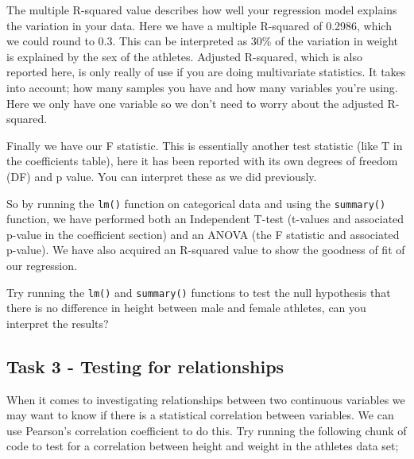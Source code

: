 \documentclass[
]{book}
\newenvironment{Shaded}{\begin{snugshade}}{\end{snugshade}}
\newcommand{\AttributeTok}[1]{\textcolor[rgb]{0.13,0.29,0.53}{#1}}
\newcommand{\CommentTok}[1]{\textcolor[rgb]{0.56,0.35,0.01}{\textit{#1}}}
\newcommand{\FunctionTok}[1]{\textcolor[rgb]{0.13,0.29,0.53}{\textbf{#1}}}
\newcommand{\NormalTok}[1]{#1}
\newcommand{\OtherTok}[1]{\textcolor[rgb]{0.56,0.35,0.01}{#1}}
\newcommand{\SpecialCharTok}[1]{\textcolor[rgb]{0.81,0.36,0.00}{\textbf{#1}}}
\newcommand{\StringTok}[1]{\textcolor[rgb]{0.31,0.60,0.02}{#1}}
\begin{document}
The multiple R-squared value describes how well your regression model explains the variation in your data. Here we have a multiple R-squared of 0.2986, which we could round to 0.3. This can be interpreted as 30\% of the variation in weight is explained by the sex of the athletes. Adjusted R-squared, which is also reported here, is only really of use if you are doing multivariate statistics. It takes into account; how many samples you have and how many variables you're using. Here we only have one variable so we don't need to worry about the adjusted R-squared.

Finally we have our F statistic. This is essentially another test statistic (like T in the coefficients table), here it has been reported with its own degrees of freedom (DF) and p value. You can interpret these as we did previously.

So by running the \texttt{lm()} function on categorical data and using the \texttt{summary()} function, we have performed both an Independent T-test (t-values and associated p-value in the coefficient section) and an ANOVA (the F statistic and associated p-value). We have also acquired an R-squared value to show the goodness of fit of our regression.

Try running the \texttt{lm()} and \texttt{summary()} functions to test the null hypothesis that there is no difference in height between male and female athletes, can you interpret the results?

\hypertarget{task-3---testing-for-relationships}{%
\subsection{Task 3 - Testing for relationships}\label{task-3---testing-for-relationships}}

When it comes to investigating relationships between two continuous variables we may want to know if there is a statistical correlation between variables. We can use Pearson's correlation coefficient to do this. Try running the following chunk of code to test for a correlation between height and weight in the athletes data set;

\begin{Shaded}
\end{Shaded}
\end{document}
